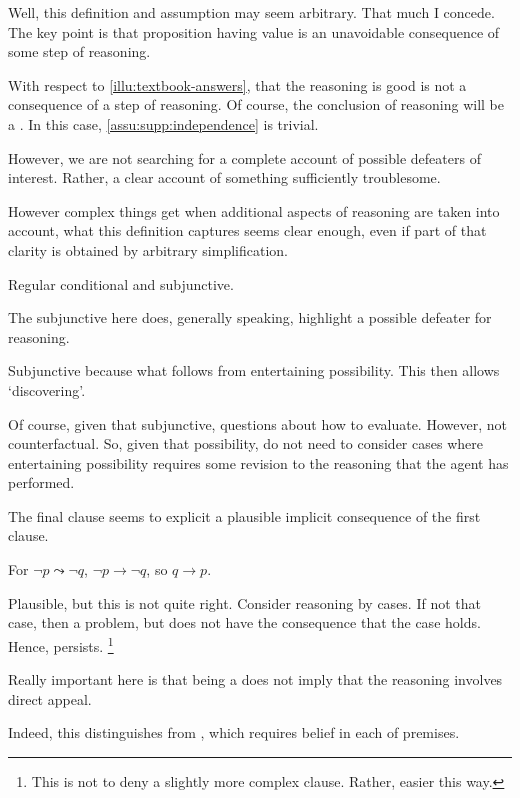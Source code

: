 \begin{note}
  Well, this definition and assumption may seem arbitrary.
  That much I concede.
  The key point is that proposition having value is an unavoidable consequence of some step of reasoning.

  With respect to \autoref{illu:textbook-answers}, that the reasoning is good is not a consequence of a step of reasoning.
  Of course, the conclusion of reasoning will be a \requ{}.
  In this case, \autoref{assu:supp:independence} is trivial.

  However, we are not searching for a complete account of possible defeaters of interest.
  Rather, a clear account of something sufficiently troublesome.

  However complex things get when additional aspects of reasoning are taken into account, what this definition captures seems clear enough, even if part of that clarity is obtained by arbitrary simplification.
\end{note}

\begin{note}
  Regular conditional and subjunctive.
\end{note}

\begin{note}
  The subjunctive here does, generally speaking, highlight a possible defeater for reasoning.

  Subjunctive because what follows from entertaining possibility.
  This then allows `discovering'.

  Of course, given that subjunctive, questions about how to evaluate.
  However, not counterfactual.
  So, given that possibility, do not need to consider cases where entertaining possibility requires some revision to the reasoning that the agent has performed.

  The final clause seems to explicit a plausible implicit consequence of the first clause.

  For \(\lnot p \leadsto \lnot q\), \(\lnot p \rightarrow \lnot q\), so \(q \rightarrow p\).

  Plausible, but this is not quite right.
  Consider reasoning by cases.
  If not that case, then a problem, but does not have the consequence that the case holds.
  Hence, persists.\nolinebreak
  \footnote{
    This is not to deny a slightly more complex clause.
    Rather, easier this way.
  }
\end{note}

\begin{note}
  Really important here is that being a \requ{} does not imply that the reasoning involves direct appeal.

  {
    \color{red}
    Indeed, this distinguishes from \citeauthor{Sgaravatti:2013wu}, which requires belief in each of premises.
  }
\end{note}


